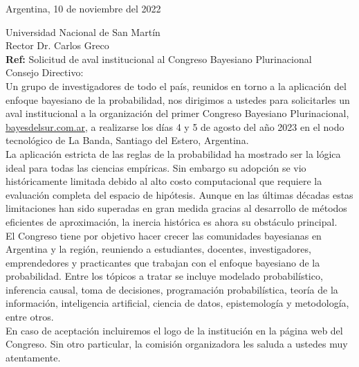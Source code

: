 \documentclass[a4paper,11pt]{article}
\begin{document}
\begin{flushright}
Argentina, 10 de noviembre del 2022
\end{flushright} 

\vspace{0.1cm}
\noindent
Universidad Nacional de San Martín \\
Rector Dr.  Carlos Greco\\[-0.1cm]

\hfill \textbf{Ref:} Solicitud de aval institucional al Congreso Bayesiano Plurinacional \\

\vspace{0.3cm} \noindent Consejo Directivo:\\

\indent Un grupo de investigadores de todo el país, reunidos en torno a la aplicación del enfoque bayesiano de la probabilidad, nos dirigimos a ustedes para solicitarles un aval institucional a la organización del primer Congreso Bayesiano Plurinacional, \url{bayesdelsur.com.ar}, a realizarse los días 4 y 5 de agosto del año 2023 en el nodo tecnológico de La Banda, Santiago del Estero, Argentina. \\

\indent La aplicación estricta de las reglas de la probabilidad ha mostrado ser la lógica ideal para todas las ciencias empíricas.
Sin embargo su adopción se vio históricamente limitada debido al alto costo computacional que requiere la evaluación completa del espacio de hipótesis.
Aunque en las últimas décadas estas limitaciones han sido superadas en gran medida gracias al desarrollo de métodos eficientes de aproximación, la inercia histórica es ahora su obstáculo principal. \\

\indent  El Congreso tiene por objetivo hacer crecer las comunidades bayesianas en Argentina y la región, reuniendo a estudiantes, docentes, investigadores, emprendedores y practicantes que trabajan con el enfoque bayesiano de la probabilidad. Entre los tópicos a tratar se incluye modelado probabilístico, inferencia causal, toma de decisiones, programación probabilística, teoría de la información, inteligencia artificial, ciencia de datos, epistemología y metodología, entre otros. \\

\indent En caso de aceptación incluiremos el logo de la institución en la página web del Congreso. Sin otro particular, la comisión organizadora les saluda a ustedes muy atentamente.\\
\end{document}
